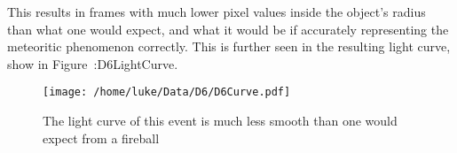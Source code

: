 This results in frames with much lower pixel values inside the object's radius than what one would expect, and what it would be if accurately representing the meteoritic phenomenon correctly. This is further seen in the resulting light curve, show in Figure~:{D6LightCurve}.

\begin{figure}[ht!]
	\centering
	\texttt{[image: /home/luke/Data/D6/D6Curve.pdf]}
	\caption{The light curve of this event is much less smooth than one would expect from a fireball}
	\label{fig:D6LightCurve}
\end{figure}

